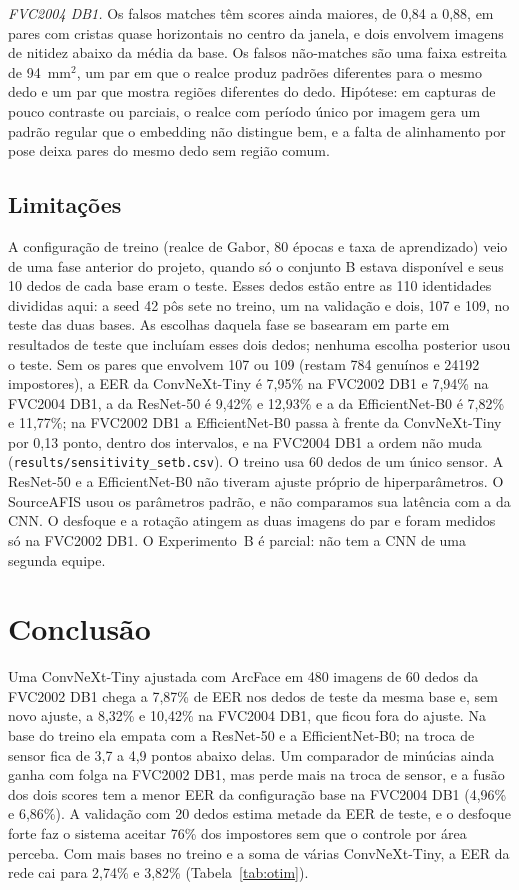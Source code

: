 \documentclass[conference]{IEEEtran}
\begin{document}
\emph{FVC2004 DB1.} Os falsos matches têm scores ainda maiores, de 0,84 a 0,88, em pares com cristas quase horizontais no centro da janela, e dois envolvem imagens de nitidez abaixo da média da base. Os falsos não-matches são uma faixa estreita de 94~mm$^2$, um par em que o realce produz padrões diferentes para o mesmo dedo e um par que mostra regiões diferentes do dedo. Hipótese: em capturas de pouco contraste ou parciais, o realce com período único por imagem gera um padrão regular que o embedding não distingue bem, e a falta de alinhamento por pose deixa pares do mesmo dedo sem região comum.

\subsection{Limitações}

A configuração de treino (realce de Gabor, 80 épocas e taxa de aprendizado) veio de uma fase anterior do projeto, quando só o conjunto B estava disponível e seus 10 dedos de cada base eram o teste. Esses dedos estão entre as 110 identidades divididas aqui: a seed 42 pôs sete no treino, um na validação e dois, 107 e 109, no teste das duas bases. As escolhas daquela fase se basearam em parte em resultados de teste que incluíam esses dois dedos; nenhuma escolha posterior usou o teste. Sem os pares que envolvem 107 ou 109 (restam 784 genuínos e \num{24192} impostores), a EER da ConvNeXt-Tiny é 7,95\% na FVC2002 DB1 e 7,94\% na FVC2004 DB1, a da ResNet-50 é 9,42\% e 12,93\% e a da EfficientNet-B0 é 7,82\% e 11,77\%; na FVC2002 DB1 a EfficientNet-B0 passa à frente da ConvNeXt-Tiny por 0,13 ponto, dentro dos intervalos, e na FVC2004 DB1 a ordem não muda (\texttt{results/sensitivity\_setb.csv}). O treino usa 60 dedos de um único sensor. A ResNet-50 e a EfficientNet-B0 não tiveram ajuste próprio de hiperparâmetros. O SourceAFIS usou os parâmetros padrão, e não comparamos sua latência com a da CNN. O desfoque e a rotação atingem as duas imagens do par e foram medidos só na FVC2002 DB1. O Experimento~B é parcial: não tem a CNN de uma segunda equipe.

\section{Conclusão}
\label{sec:conclusao}

Uma ConvNeXt-Tiny ajustada com ArcFace em 480 imagens de 60 dedos da FVC2002 DB1 chega a 7,87\% de EER nos dedos de teste da mesma base e, sem novo ajuste, a 8,32\% e 10,42\% na FVC2004 DB1, que ficou fora do ajuste. Na base do treino ela empata com a ResNet-50 e a EfficientNet-B0; na troca de sensor fica de 3,7 a 4,9 pontos abaixo delas. Um comparador de minúcias ainda ganha com folga na FVC2002 DB1, mas perde mais na troca de sensor, e a fusão dos dois scores tem a menor EER da configuração base na FVC2004 DB1 (4,96\% e 6,86\%). A validação com 20 dedos estima metade da EER de teste, e o desfoque forte faz o sistema aceitar 76\% dos impostores sem que o controle por área perceba. Com mais bases no treino e a soma de várias ConvNeXt-Tiny, a EER da rede cai para 2,74\% e 3,82\% (Tabela~\ref{tab:otim}).
\end{document}
